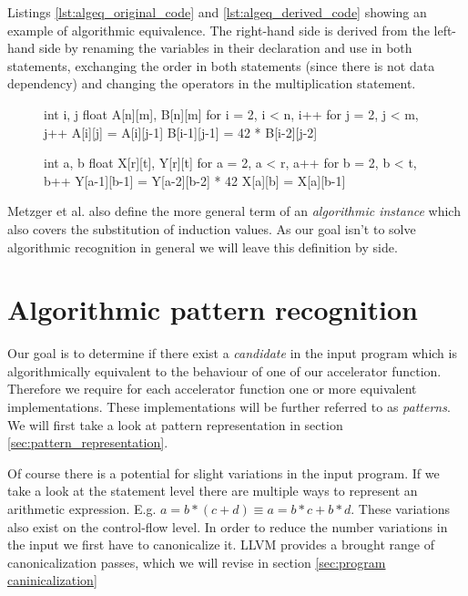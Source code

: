 Listings \ref{lst:algeq_original_code} and \ref{lst:algeq_derived_code} showing an example of algorithmic equivalence. The right-hand side is derived from the left-hand side by renaming the variables in their declaration and use in both statements, exchanging the order in both statements (since there is not data dependency) and changing the operators in the multiplication statement.

\begin{figure}[!htb]
\noindent\begin{minipage}{.45\textwidth}
\begin{algorithm}[caption={Original code}, label=lst:algeq_original_code]
int i, j
float A[n][m], B[n][m]
for i = 2, i < n, i++
	for j = 2, j < m, j++
		A[i][j] = A[i][j-1]
		B[i-1][j-1] = 42 * B[i-2][j-2]
\end{algorithm}
\end{minipage}\hfill %
\begin{minipage}{.5\textwidth}
\begin{algorithm}[caption={Derived code}, label={lst:algeq_derived_code}]
int a, b
float X[r][t], Y[r][t] 
for a = 2, a < r, a++
	for b = 2, b < t, b++
		Y[a-1][b-1] = Y[a-2][b-2] * 42
		X[a][b] = X[a][b-1]
\end{algorithm}
\end{minipage}
\end{figure}

Metzger et al. also define the more general term of an \textit{algorithmic instance} which also covers the substitution of induction values. As our goal isn't to solve algorithmic recognition in general we will leave this definition by side.

\section{Algorithmic pattern recognition}

Our goal is to determine if there exist a \textit{candidate} in the input program which is algorithmically equivalent to the behaviour of one of our accelerator function. Therefore we require for each accelerator function one or more equivalent implementations. These implementations will be further referred to as \textit{patterns}. We will first take a look at pattern representation in section \ref{sec:pattern_representation}.

Of course there is a potential for slight variations in the input program. If we take a look at the statement level there are multiple ways to represent an arithmetic expression. E.g. $a = b *( c + d ) \equiv a = b*c + b*d$. These variations also exist on the control-flow level. In order to reduce the number variations in the input we first have to canonicalize it. LLVM provides a brought range of canonicalization passes, which we will revise in section \ref{sec:program caninicalization}

